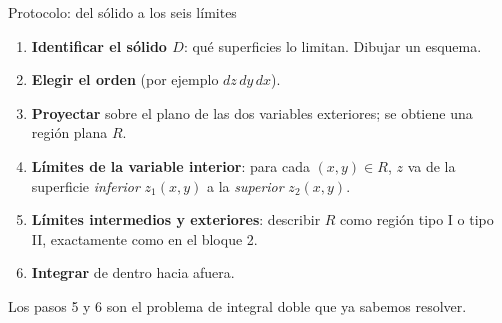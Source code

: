 \documentclass[11pt,aspectratio=169]{beamer}
\begin{document}
\begin{frame}{Protocolo: del sólido a los seis límites}
  \begin{enumerate}
    \setlength{\itemsep}{4pt}
    \item \textbf{Identificar el sólido $D$}: qué superficies lo limitan. Dibujar un esquema.
    \item \textbf{Elegir el orden} (por ejemplo $dz\,dy\,dx$).
    \item \textbf{Proyectar} sobre el plano de las dos variables exteriores; se obtiene una región plana $R$.
    \item \textbf{Límites de la variable interior}: para cada $(x,y)\in R$, $z$ va de la superficie \emph{inferior} $z_1(x,y)$ a la \emph{superior} $z_2(x,y)$.
    \item \textbf{Límites intermedios y exteriores}: describir $R$ como región tipo I o tipo II, exactamente como en el bloque 2.
    \item \textbf{Integrar} de dentro hacia afuera.
  \end{enumerate}
  \vspace{6pt}
  \pause
  \begin{center}
  \normalsize\color{tealx} Los pasos 5 y 6 son el problema de integral doble que ya sabemos resolver.
  \end{center}
\end{frame}
\end{document}
